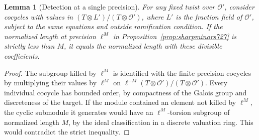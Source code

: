 \documentclass[a4paper,11pt]{article}
\newtheorem{lemma}[proposition]{Lemma}
\theoremstyle{definition}
\theoremstyle{remark}
\numberwithin{equation}{section}
\begin{document}
\begin{lemma}[Detection at a single precision]\leavevmode
\label{lem:precisionlength727}
For any fixed twist over \(\mathcal O'\), consider cocycles with values
in \((T\otimes L')/(T\otimes\mathcal O')\), where \(L'\) is the fraction
field of \(\mathcal O'\), subject to the same equations and outside
ramification condition. If the normalized length at precision
\(\ell^M\) in Proposition~\ref{prop:sharpminors727} is strictly less
than \(M\), it equals the normalized length with these divisible
coefficients.
\end{lemma}
\begin{proof}
The subgroup killed by \(\ell^M\) is identified with the finite
precision cocycles by multiplying their values by \(\ell^M\) on
\(\ell^{-M}(T\otimes\mathcal O')/(T\otimes\mathcal O')\).
Every individual cocycle has bounded order, by compactness of the
Galois group and discreteness of the target. If the module contained
an element not killed by \(\ell^M\), the cyclic submodule it generates
would have an \(\ell^M\)-torsion subgroup of normalized length \(M\),
by the ideal classification in a discrete valuation ring. This would
contradict the strict inequality.
\end{proof}
\end{document}
